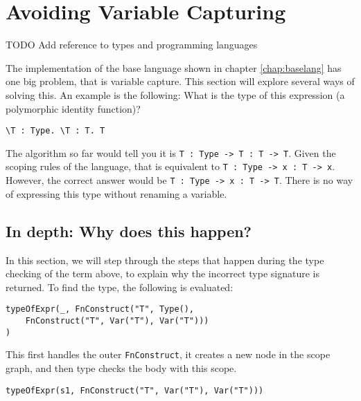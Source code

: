 
\chapter{\label{chap:namecolls}Avoiding Variable Capturing}

TODO Add reference to types and programming languages

The implementation of the base language shown in chapter \ref{chap:baselang} has one big problem, that is variable capture. This section will explore several ways of solving this. An example is the following: What is the type of this expression (a polymorphic identity function)?
\begin{lstlisting}
\T : Type. \T : T. T
\end{lstlisting}

The algorithm so far would tell you it is \verb|T : Type -> T : T -> T|. Given the scoping rules of the language, that is equivalent to \verb|T : Type -> x : T -> x|. However, the correct answer would be \verb|T : Type -> x : T -> T|. There is no way of expressing this type without renaming a variable.

\section{In depth: Why does this happen?}

In this section, we will step through the steps that happen during the type checking of the term above, to explain why the incorrect type signature is returned. To find the type, the following is evaluated:

\begin{lstlisting}
typeOfExpr(_, FnConstruct("T", Type(), 
    FnConstruct("T", Var("T"), Var("T")))
)
\end{lstlisting}

\noindent
This first handles the outer \verb|FnConstruct|, it creates a new node in the scope graph, and then type checks the body with this scope.

\begin{lstlisting}
typeOfExpr(s1, FnConstruct("T", Var("T"), Var("T")))
\end{lstlisting}


